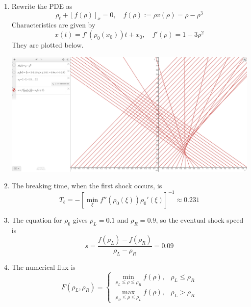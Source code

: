 \documentclass{article}
\newcommand{\sbr}[1]{\left[#1\right]}
\newcommand{\inv}{^{-1}}
\newcommand{\p}{\rho}
\begin{document}
\begin{enumerate}
\begin{enumerate}
	
	\item Rewrite the PDE as
	\[\p_t + [f(\p)]_x = 0,
	\quad f(\p) := \p v(\p) = \p - \p^3\]
	Characteristics are given by
	\[x(t) = f'(\p_0(x_0))t + x_0,
	\quad f'(\p) = 1 - 3\p^2\]
	They are plotted below.
	\begin{center}
		\includegraphics[scale=.2]{final 3a}
	\end{center}


	\item The breaking time, when the first shock occurs, is
	\[T_b = -\sbr{\min_\xi f''(\p_0(\xi))\p_0'(\xi)}\inv \approx 0.231\]
	
	\item The equation for $\p_0$ gives $\p_L=0.1$ and $\p_R=0.9$, so the eventual shock speed is
	\[s = \frac{f(\p_L)-f(\p_R)}{\p_L-\p_R} = 0.09\]
	
	\item The numerical flux is
	\[F(\p_L,\p_R) =
	\begin{cases}
		\min_{\p_L\le\p\le\p_R}f(\p), & \p_L\le\p_R \\
		\max_{\p_R\le\p\le\p_L}f(\p), & \p_L>\p_R
	\end{cases}\]


\end{enumerate}
\end{enumerate}
\end{document}
